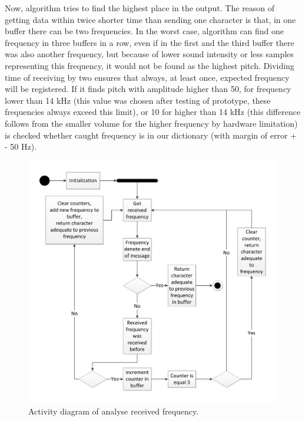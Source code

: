 \documentclass[11pt,titlepage]{article}
\theoremstyle{plain}
\begin{document}
Now, algorithm tries to find the highest place in the output. The reason of getting data within twice shorter time than sending one character is that, in one buffer there can be two frequencies. In the worst case, algorithm can find one frequency in three buffers in a row, even if in the first and the third buffer there was also another frequency, but because of lower sound intensity or less samples representing this frequency, it would not be found as the highest pitch. Dividing time of receiving by two ensures that always, at least once, expected frequency will be registered. If it finds pitch with amplitude higher than 50, for frequency lower than 14 kHz (this value was chosen after testing of prototype, these frequencies always exceed this limit), or 10 for higher than 14 kHz (this difference follows from the smaller volume for the higher frequency by hardware limitation) is checked whether caught frequency is in our dictionary (with margin of error + - 50 Hz). 

\begin{figure}[H]
	\centering
	\includegraphics[width=1\textwidth]{img/analyse_of_sound.pdf}
	\caption{Activity diagram of analyse received frequency.}
	\label{fig:F23}
\end{figure}
\end{document}
